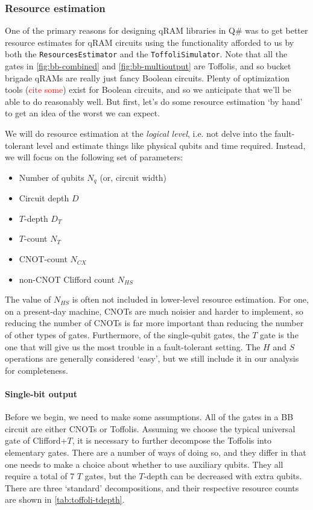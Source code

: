 \documentclass[a4paper,12pt]{article}
\newcommand\todo[1]{\textcolor{red}{#1}}
\begin{document}
\subsubsection{Resource estimation}

One of the primary reasons for designing qRAM libraries in Q\# was to get better resource estimates for qRAM circuits using the functionality afforded to us by both the \texttt{ResourcesEstimator} and the \texttt{ToffoliSimulator}.
Note that all the gates in \autoref{fig:bb-combined} and \autoref{fig:bb-multioutput} are Toffolis, and so bucket brigade qRAMs are really just fancy Boolean circuits. 
Plenty of optimization tools (\todo{cite some}) exist for Boolean circuits, and so we anticipate that we'll be able to do reasonably well. 
But first, let's do some resource estimation `by hand' to get an idea of the worst we can expect.

We will do resource estimation at the \emph{logical level}, i.e. not delve into the fault-tolerant level and estimate things like physical qubits and time required. 
Instead, we will focus on the following set of parameters:
\begin{itemize}
 \item Number of qubits $N_q$ (or, circuit width)
 \item Circuit depth $D$
 \item $T$-depth $D_T$
 \item $T$-count $N_T$
 \item CNOT-count $N_{CX}$
 \item non-CNOT Clifford count $N_{HS}$
\end{itemize}
The value of $N_{HS}$ is often not included in lower-level resource estimation. 
For one, on a present-day machine, CNOTs are much noisier and harder to implement, so reducing the number of CNOTs is far more important than reducing the number of other types of gates. 
Furthermore, of the single-qubit gates, the $T$ gate is the one that will give us the most trouble in a fault-tolerant setting. 
The $H$ and $S$ operations are generally considered `easy', but we still include it in our analysis for completeness.

\paragraph{Single-bit output}

Before we begin, we need to make some assumptions. 
All of the gates in a BB circuit are either CNOTs or Toffolis. 
Assuming we choose the typical universal gate of Clifford+$T$, it is necessary to further decompose the Toffolis into elementary gates.
There are a number of ways of doing so, and they differ in that one needs to make a choice about whether to use auxiliary qubits. 
They all require a total of 7 $T$ gates, but the $T$-depth can be decreased with extra qubits. 
There are three `standard' decompositions, and their respective resource counts are shown in \autoref{tab:toffoli-tdepth}. 
\end{document}
